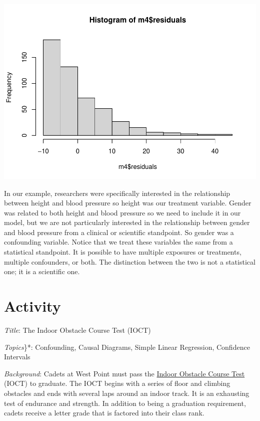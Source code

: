 \documentclass[
]{book}
\begin{document}
\includegraphics{MA206supplement_files/figure-latex/unnamed-chunk-15-1.pdf}

In our example, researchers were specifically interested in the relationship between height and blood pressure so height was our treatment variable. Gender was related to both height and blood pressure so we need to include it in our model, but we are not particularly interested in the relationship between gender and blood pressure from a clinical or scientific standpoint. So gender was a confounding variable. Notice that we treat these variables the same from a statistical standpoint. It is possible to have multiple exposures or treatments, multiple confounders, or both. The distinction between the two is not a statistical one; it is a scientific one.\\

\hypertarget{activity}{%
\chapter{Activity}\label{activity}}

\emph{Title}: The Indoor Obstacle Course Test (IOCT)

\emph{Topics}\}*: Confounding, Causal Diagrams, Simple Linear Regression, Confidence Intervals

\emph{Background}: Cadets at West Point must pass the \href{https://www.youtube.com/watch?v=94tPO0fGtJo\&t=77s}{Indoor Obstacle Course Test} (IOCT) to graduate. The IOCT begins with a series of floor and climbing obstacles and ends with several laps around an indoor track. It is an exhausting test of endurance and strength. In addition to being a graduation requirement, cadets receive a letter grade that is factored into their class rank.
\end{document}
